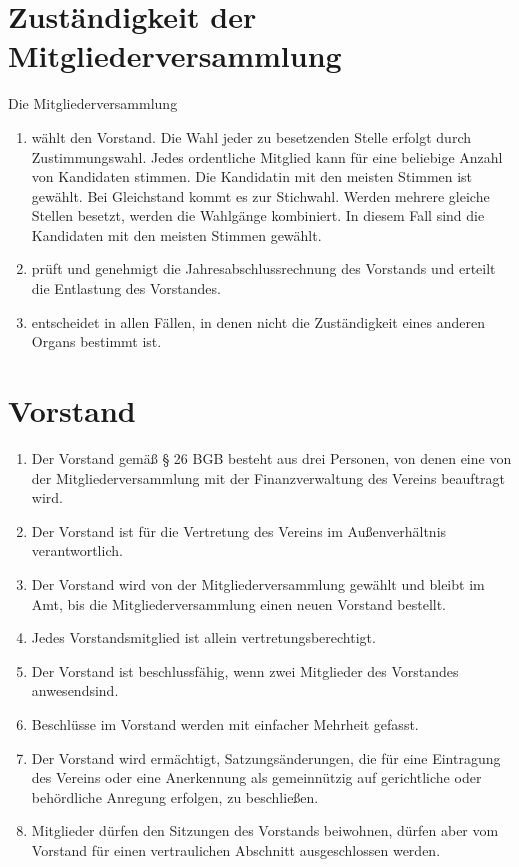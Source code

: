 \documentclass[a4paper, 12pt]{scrartcl}
\begin{document}
\section{Zuständigkeit der Mitgliederversammlung}
Die Mitgliederversammlung
\begin{enumerate}
  \item wählt den Vorstand. Die Wahl jeder zu besetzenden Stelle erfolgt durch Zustimmungswahl. Jedes ordentliche Mitglied kann für eine beliebige Anzahl von Kandidaten stimmen. Die Kandidatin mit den meisten Stimmen ist gewählt. Bei Gleichstand kommt es zur Stichwahl. Werden mehrere gleiche Stellen besetzt, werden die Wahlgänge kombiniert. In diesem Fall sind die Kandidaten mit den meisten Stimmen gewählt.
  \item prüft und genehmigt die Jahresabschlussrechnung des Vorstands und erteilt die Entlastung des Vorstandes.
  \item entscheidet in allen Fällen, in denen nicht die Zuständigkeit eines anderen Organs bestimmt ist.
\end{enumerate}

\section{Vorstand}
\begin{enumerate}
  \item Der Vorstand gemäß § 26 BGB besteht aus drei Personen, von denen eine von der Mitgliederversammlung mit der Finanzverwaltung des Vereins beauftragt wird.
  \item Der Vorstand ist für die Vertretung des Vereins im Außenverhältnis verantwortlich.
  \item Der Vorstand wird von der Mitgliederversammlung gewählt und bleibt im Amt, bis die Mitgliederversammlung einen neuen Vorstand bestellt.
  \item Jedes Vorstandsmitglied ist allein vertretungsberechtigt.
  \item Der Vorstand ist beschlussfähig, wenn zwei Mitglieder des Vorstandes anwesendsind.
  \item Beschlüsse im Vorstand werden mit einfacher Mehrheit gefasst.
  \item Der Vorstand wird ermächtigt, Satzungsänderungen, die für eine Eintragung des Vereins oder eine Anerkennung als gemeinnützig auf gerichtliche oder behördliche Anregung erfolgen, zu beschließen.
  \item Mitglieder dürfen den Sitzungen des Vorstands beiwohnen, dürfen aber vom Vorstand für einen vertraulichen Abschnitt ausgeschlossen werden.
\end{enumerate}
\end{document}
